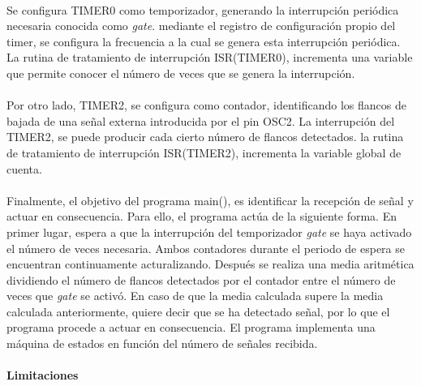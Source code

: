 \paragraph{}
Se configura TIMER0 como temporizador, generando la interrupci\'on periódica necesaria conocida como \textit{gate}. mediante el registro de configuración propio del timer, se configura la frecuencia a la cual se genera esta interrupción peri\'odica. La rutina de tratamiento de interrupción ISR(TIMER0), incrementa una variable que permite conocer el n\'umero de veces que se genera la interrupci\'on.
\paragraph{}
Por otro lado, TIMER2, se configura como contador, identificando los flancos de bajada de una señal externa introducida por el pin OSC2. La interrupción del TIMER2, se puede producir cada cierto número de flancos detectados. la rutina de tratamiento de interrupción ISR(TIMER2), incrementa la variable global de cuenta.

\paragraph{}
Finalmente, el objetivo del programa main(), es identificar la recepci\'on de señal y actuar en consecuencia.
Para ello, el programa actúa de la siguiente forma. 
En primer lugar, espera a que la interrupci\'on del temporizador \textit{gate} se haya activado el número de veces necesaria. Ambos contadores durante el periodo de espera se encuentran continuamente acturalizando.
Después se realiza una media aritmética dividiendo el número de flancos detectados por el contador entre el número de veces que \textit{gate} se activó.
En caso de que la media calculada supere la media calculada anteriormente, quiere decir que se ha detectado señal, por lo que el programa procede a actuar en consecuencia.
El programa implementa una máquina de estados en función del número de señales recibida.

\paragraph{Limitaciones}
